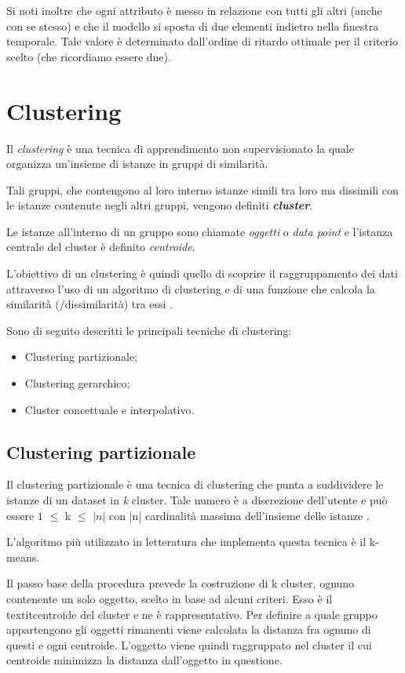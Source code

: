 \documentclass[12pt,a4paper,twoside,openright]{book}
\begin{document}
Si noti inoltre che ogni attributo è messo in relazione con tutti gli altri (anche con se stesso) e che il modello si sposta di due elementi indietro nella finestra temporale. Tale valore è determinato dall'ordine di ritardo ottimale per il criterio scelto (che ricordiamo essere due).
\newpage
\section{Clustering}
Il \textit{clustering} è una tecnica di apprendimento non supervisionato la quale organizza un'insieme di istanze in gruppi di similarità. 

Tali gruppi, che contengono al loro interno istanze simili tra loro ma dissimili con le istanze contenute negli altri gruppi, vengono definiti \textit{\textbf{cluster}}. 

Le istanze all'interno di un gruppo sono chiamate \textit{oggetti} o \textit{data point} e l'istanza centrale del cluster è definito \textit{centroide}.

L'obiettivo di un clustering è quindi quello di scoprire il raggruppamento dei dati attraverso l'uso di un algoritmo di clustering e di una funzione che calcola la similarità (/dissimilarità) tra essi \cite{16a}.

Sono di seguito descritti le principali tecniche di clustering:
\begin{itemize}
\item Clustering partizionale;
\item Clustering gerarchico;
\item Cluster concettuale e interpolativo.
\end{itemize}

\subsection{Clustering partizionale}
Il clustering partizionale è una tecnica di clustering che punta a suddividere le istanze di un dataset in \textit{k} cluster. Tale numero è a discrezione dell'utente e può essere $1$ $\leq$ k $\leq$ $|n|$ con |n| cardinalità massima dell'insieme delle istanze \cite{17a}. 

L'algoritmo più utilizzato in letteratura che implementa questa tecnica è il k-means.

Il passo base della procedura prevede la costruzione di k cluster, ognuno contenente un solo oggetto, scelto in base ad alcuni criteri. Esso è il textit{centroide} del cluster e ne è rappresentativo. Per definire a quale gruppo appartengono gli oggetti rimanenti viene calcolata la distanza fra ognuno di questi e ogni centroide. L’oggetto viene quindi raggruppato nel cluster il cui centroide minimizza la distanza dall’oggetto in questione.
\end{document}

